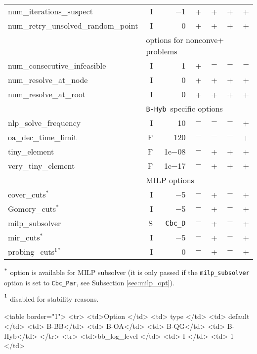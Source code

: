 {\begin{latexonly}
\begin{threeparttable}
\begin{tabular}{|l|r|r|r|r|r|r|}
num\_iterations\_suspect & I & $-$1 & + & + & + & + \\
num\_retry\_unsolved\_random\_point & I & 0 & + & + & + & + \\
\hline
\multicolumn{1}{|c}{} & \multicolumn{6}{l|}{options for nonconve+ problems}\\
\hline
num\_consecutive\_infeasible & I & 1 & + & $-$ & $-$ & $-$\\
num\_resolve\_at\_node & I & 0 & + & +  & + & + \\
num\_resolve\_at\_root & I & 0& + & + & + & +  \\
\hline
\multicolumn{1}{|c}{} & \multicolumn{6}{l|}{{\tt B-Hyb }specific options}\\
\hline
nlp\_solve\_frequency & I & 10 & $-$ & $-$ & $-$ & +\\
oa\_dec\_time\_limit & F& 120 & $-$ & $-$ & $-$ & +\\
tiny\_element & F & 1e$-$08 & $-$ & + & + & + \\
very\_tiny\_element & F & 1e$-$17 & $-$ & + & + & + \\
\hline
\multicolumn{1}{|c}{} & \multicolumn{6}{l|}{MILP options}\\
\hline
cover\_cuts$^*$  & I & $-$5 & $-$ & + & $-$ & +\\
Gomory\_cuts$^*$ & I & $-$5 & $-$ &  + & $-$ & + \\
milp\_subsolver &S & {\tt Cbc\_D} & $-$ & + & $-$ & + \\
mir\_cuts$^*$  & I & $-$5 & $-$  & + & $-$ &+\\
probing\_cuts$^1$$^*$  & I & 0 & $-$ & + & $-$ & +\\
\hline
\end{tabular}
\begin{tablenotes}
\item $\strut^*$ option is available
         for MILP subsolver (it is only passed if the {\tt milp\_subsolver} option is set to {\tt Cbc\_Par},
         see Subsection \ref{sec:milp_opt}).
\item $\strut^1$ disabled for stability reasons.
\end{tablenotes}
\end{threeparttable}
\end{latexonly}
}{
\begin{rawhtml}
<table border="1">
  <tr>
    <td>Option </td>
    <td> type </td>
    <td> default </td>
    <td> B-BB</td>
    <td> B-OA</td>
    <td> B-QG</td>
    <td> B-Hyb</td>
  </tr>
  <tr>
    <td>bb_log_level </td>
    <td> I </td>
    <td> 1 </td>

\end{rawhtml}}
